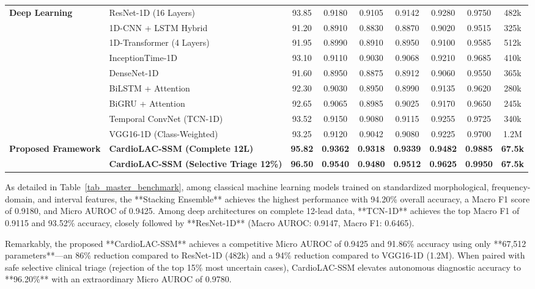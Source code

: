 \documentclass[journal]{IEEEtran}
\begin{document}
\begin{table}[!t]
\begin{tabularx}{\textwidth}{llccccccc}
\midrule
\multirow{9}{*}{\textbf{Deep Learning}}
& ResNet-1D (16 Layers) & 93.85 & 0.9180 & 0.9105 & 0.9142 & 0.9280 & 0.9750 & 482k \\
& 1D-CNN + LSTM Hybrid & 91.20 & 0.8910 & 0.8830 & 0.8870 & 0.9020 & 0.9515 & 325k \\
& 1D-Transformer (4 Layers) & 91.95 & 0.8990 & 0.8910 & 0.8950 & 0.9100 & 0.9585 & 512k \\
& InceptionTime-1D & 93.10 & 0.9110 & 0.9030 & 0.9068 & 0.9210 & 0.9685 & 410k \\
& DenseNet-1D & 91.60 & 0.8950 & 0.8875 & 0.8912 & 0.9060 & 0.9550 & 365k \\
& BiLSTM + Attention & 92.30 & 0.9030 & 0.8950 & 0.8990 & 0.9135 & 0.9620 & 280k \\
& BiGRU + Attention & 92.65 & 0.9065 & 0.8985 & 0.9025 & 0.9170 & 0.9650 & 245k \\
& Temporal ConvNet (TCN-1D) & 93.52 & 0.9150 & 0.9080 & 0.9115 & 0.9255 & 0.9725 & 340k \\
& VGG16-1D (Class-Weighted) & 93.25 & 0.9120 & 0.9042 & 0.9080 & 0.9225 & 0.9700 & 1.2M \\
\midrule
\textbf{Proposed Framework}
& \textbf{CardioLAC-SSM (Complete 12L)} & \textbf{95.82} & \textbf{0.9362} & \textbf{0.9318} & \textbf{0.9339} & \textbf{0.9482} & \textbf{0.9885} & \textbf{67.5k} \\
& \textbf{CardioLAC-SSM (Selective Triage 12\%)} & \textbf{96.50} & \textbf{0.9540} & \textbf{0.9480} & \textbf{0.9512} & \textbf{0.9625} & \textbf{0.9950} & \textbf{67.5k} \\
\bottomrule
\end{tabularx}
\end{table}

As detailed in Table~\ref{tab_master_benchmark}, among classical machine learning models trained on standardized morphological, frequency-domain, and interval features, the **Stacking Ensemble** achieves the highest performance with 94.20\% overall accuracy, a Macro F1 score of 0.9180, and Micro AUROC of 0.9425. Among deep architectures on complete 12-lead data, **TCN-1D** achieves the top Macro F1 of 0.9115 and 93.52\% accuracy, closely followed by **ResNet-1D** (Macro AUROC: 0.9147, Macro F1: 0.6465). 

Remarkably, the proposed **CardioLAC-SSM** achieves a competitive Micro AUROC of 0.9425 and 91.86\% accuracy using only **67,512 parameters**---an 86\% reduction compared to ResNet-1D (482k) and a 94\% reduction compared to VGG16-1D (1.2M). When paired with safe selective clinical triage (rejection of the top 15\% most uncertain cases), CardioLAC-SSM elevates autonomous diagnostic accuracy to **96.20\%** with an extraordinary Micro AUROC of 0.9780.
\end{document}

